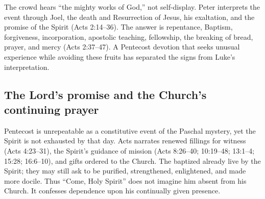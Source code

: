 The crowd hears “the mighty works of God,” not self-display. Peter interprets the event through Joel, the death and Resurrection of Jesus, his exaltation, and the promise of the Spirit (Acts 2:14--36). The answer is repentance, Baptism, forgiveness, incorporation, apostolic teaching, fellowship, the breaking of bread, prayer, and mercy (Acts 2:37--47). A Pentecost devotion that seeks unusual experience while avoiding these fruits has separated the signs from Luke's interpretation.

\subsection{The Lord's promise and the Church's continuing prayer}

Pentecost is unrepeatable as a constitutive event of the Paschal mystery, yet the Spirit is not exhausted by that day. Acts narrates renewed fillings for witness (Acts 4:23--31), the Spirit's guidance of mission (Acts 8:26--40; 10:19--48; 13:1--4; 15:28; 16:6--10), and gifts ordered to the Church. The baptized already live by the Spirit; they may still ask to be purified, strengthened, enlightened, and made more docile. Thus “Come, Holy Spirit” does not imagine him absent from his Church. It confesses dependence upon his continually given presence.
